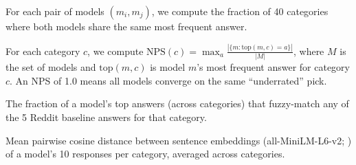  For each pair of models $(m_i, m_j)$, we compute the fraction of 40 categories where both models share the same most frequent answer.

 For each category $c$, we compute $\text{NPS}(c) = \max_a \frac{|\{m : \text{top}(m, c) = a\}|}{|M|}$, where $M$ is the set of models and $\text{top}(m, c)$ is model $m$'s most frequent answer for category $c$. An NPS of 1.0 means all models converge on the same ``underrated'' pick.

 The fraction of a model's top answers (across categories) that fuzzy-match any of the 5 Reddit baseline answers for that category.

 Mean pairwise cosine distance between sentence embeddings (all-MiniLM-L6-v2; \citealp{reimers2019sentence}) of a model's 10 responses per category, averaged across categories.
